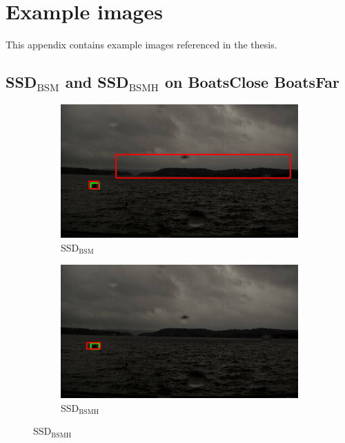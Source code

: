 
\chapter{Example images}
This appendix contains example images referenced in the thesis.


\newpage

\section{SSD$_{\text{BSM}}$ and SSD$_{\text{BSMH}}$ on BoatsClose BoatsFar}
\label{sec:bigbox}

\begin{figure}[h!]
\begin{subfigure}{.5\textwidth}
  \centering
  \includegraphics[width=0.9\linewidth]{results/case_buildings/bigbox_bcbf/SSD2/selected_06_14_axis0049.jpg}
  \caption{SSD$_{\text{BSM}}$}
  \label{fig:sfig1}
\end{subfigure}%
\begin{subfigure}{.5\textwidth}
  \centering
  \includegraphics[width=.9\linewidth]{results/case_buildings/bigbox_bcbf/SSD3/selected_06_14_axis0049.jpg}
  \caption{SSD$_{\text{BSMH}}$}
  \label{fig:sfig2}
\end{subfigure}


\end{figure}

